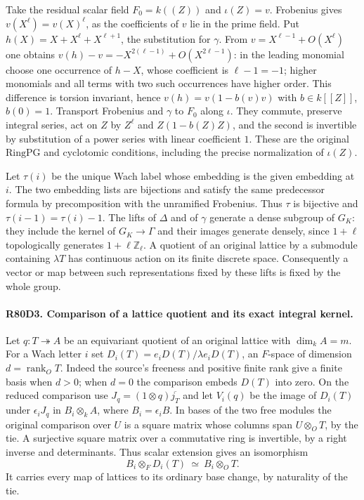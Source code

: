 Take the residual scalar field $F_0=k((Z))$ and
$\iota(Z)=v$. Frobenius gives $v(X^\ell)=v(X)^\ell$, as the
coefficients of $v$ lie in the prime field. Put
$h(X)=X+X^\ell+X^{\ell+1}$, the substitution for $\gamma$.
From $v=X^{\ell-1}+O(X^\ell)$ one obtains
$v(h)-v=-X^{2(\ell-1)}+O(X^{2\ell-1})$:
in the leading monomial choose one occurrence of $h-X$, whose
coefficient is $\ell-1=-1$; higher monomials and all terms with
two such occurrences have higher order. This difference is
torsion invariant, hence
$v(h)=v(1-b(v)v)$ with $b\in k[[Z]]$, $b(0)=1$.
Transport Frobenius and $\gamma$ to $F_0$ along $\iota$.
They commute, preserve integral series, act on $Z$ by $Z^\ell$
and $Z(1-b(Z)Z)$, and the second is invertible by substitution
of a power series with linear coefficient $1$. These are the
original $\mathrm{RingPG}$ and cyclotomic conditions, including
the precise normalization of $\iota(Z)$.

Let $\tau(i)$ be the unique Wach label whose embedding is the
given embedding at $i$. The two embedding lists are bijections
and satisfy the same predecessor formula by precomposition with
the unramified Frobenius. Thus $\tau$ is bijective and
$\tau(i-1)=\tau(i)-1$. The lifts of $\Delta$ and of $\gamma$
generate a dense subgroup of $G_K$: they include the kernel of
$G_K\to\Gamma$ and their images generate densely, since
$1+\ell$ topologically generates $1+\ell\mathbb Z_\ell$.
A quotient of an original lattice by a submodule containing
$\lambda T$ has continuous action on its finite discrete space.
Consequently a vector or map between such representations fixed
by these lifts is fixed by the whole group.

\paragraph{R80D3. Comparison of a lattice quotient and its exact integral kernel.}
Let $q:T\twoheadrightarrow A$ be an equivariant quotient of an
original lattice with $\dim_k A=m$. For a Wach letter $i$ set
$D_i(T)=e_iD(T)/\lambda e_iD(T)$, an $F$-space of dimension
$d=\operatorname{rank}_O T$. Indeed the source's freeness and
positive finite rank give a finite basis when $d>0$; when
$d=0$ the comparison embeds $D(T)$ into zero. On the reduced
comparison use
$J_q=(1\otimes q)\overline{j_T}$ and let $V_i(q)$ be the
image of $D_i(T)$ under $\epsilon_i J_q$ in
$B_i\otimes_k A$, where $B_i=\epsilon_i B$. In bases of the two
free modules the original comparison over $U$ is a square matrix
whose columns span $U\otimes_O T$, by the tie. A surjective square
matrix over a commutative ring is invertible, by a right inverse
and determinants. Thus scalar extension gives an isomorphism
\[
       B_i\otimes_F D_i(T)\ \simeq\ B_i\otimes_O T .
\]
It carries every map of lattices to its ordinary base change,
by naturality of the tie.

